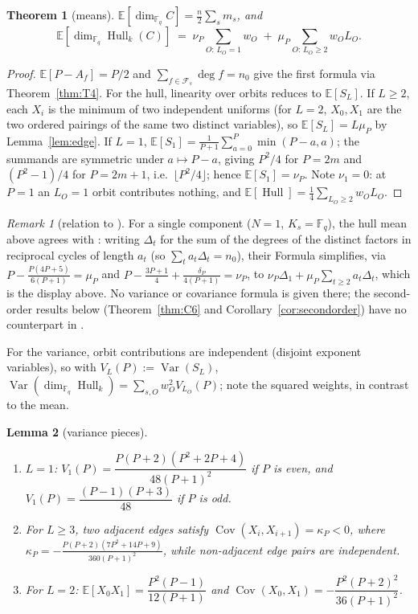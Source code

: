 \documentclass[11pt]{article}
\newtheorem{theorem}{Theorem}[section]
\newtheorem{lemma}[theorem]{Lemma}
\theoremstyle{definition}
\theoremstyle{remark}
\newtheorem*{remark}{Remark}
\newcommand{\Fq}{\mathbb{F}_q}
\newcommand{\Hull}{\operatorname{Hull}}
\newcommand{\E}{\mathbb{E}}
\begin{document}
\begin{theorem}[means]\label{thm:C5}
\(\displaystyle \E[\dim_{\Fq} C] = \frac{n}{2} \sum_s m_s\), and
\[
\E[\dim_{\Fq} \Hull_k(C)] \;=\;
\nu_P \sum_{O:\, L_O = 1} w_O \;+\;
\mu_P \sum_{O:\, L_O \ge 2} w_O L_O .
\]
\end{theorem}

\begin{proof}
\(\E[P - A_f] = P/2\) and \(\sum_{f \in \mathcal{F}_s} \deg f = n_0\)
give the first formula via Theorem~\ref{thm:T4}. For the hull, linearity
over orbits reduces to \(\E[S_L]\). If \(L \ge 2\), each \(X_i\) is the
minimum of two independent uniforms (for \(L=2\), \(X_0, X_1\) are the
two ordered pairings of the same two distinct variables), so
\(\E[S_L] = L\mu_P\) by Lemma~\ref{lem:edge}. If \(L = 1\),
\(\E[S_1] = \frac{1}{P+1}\sum_{a=0}^P \min(P-a,a)\); the summands are
symmetric under \(a \mapsto P-a\), giving \(P^2/4\) for \(P = 2m\) and
\((P^2-1)/4\) for \(P = 2m+1\), i.e.\ \(\lfloor P^2/4 \rfloor\); hence
\(\E[S_1] = \nu_P\). Note \(\nu_1 = 0\): at \(P=1\) an \(L_O=1\) orbit
contributes nothing, and \(\E[\Hull] = \frac14 \sum_{L_O\ge2} w_O L_O\).
\end{proof}

\begin{remark}[relation to \cite{DP2025}]
For a single component (\(N = 1\), \(K_s = \Fq\)), the hull mean above
agrees with \cite[Theorem~3.3]{DP2025}: writing \(\Delta_t\) for the sum
of the degrees of the distinct factors in reciprocal cycles of length
\(a_t\) (so \(\sum_t a_t \Delta_t = n_0\)), their Formula simplifies,
via \(P - \frac{P(4P+5)}{6(P+1)} = \mu_P\) and
\(P - \frac{3P+1}{4} + \frac{\delta_P}{4(P+1)} = \nu_P\), to
\(\nu_P \Delta_1 + \mu_P \sum_{t \ge 2} a_t \Delta_t\), which is the
display above. No variance or covariance formula is given there; the
second-order results below (Theorem~\ref{thm:C6} and
Corollary~\ref{cor:secondorder}) have no counterpart in \cite{DP2025}.
\end{remark}

For the variance, orbit contributions are independent (disjoint exponent
variables), so with \(V_L(P) := \operatorname{Var}(S_L)\),
\(\operatorname{Var}(\dim_{\Fq}\Hull_k) = \sum_{s,O} w_O^2 V_{L_O}(P)\);
note the squared weights, in contrast to the mean.

\begin{lemma}[variance pieces]\label{lem:varpieces}
\begin{enumerate}
\item[(i)] \(L=1\):
\(V_1(P) = \dfrac{P(P+2)(P^2+2P+4)}{48(P+1)^2}\) if \(P\) is even, and
\(V_1(P) = \dfrac{(P-1)(P+3)}{48}\) if \(P\) is odd.
\item[(ii)] For \(L \ge 3\), two adjacent edges satisfy
\(\operatorname{Cov}(X_i, X_{i+1}) = \kappa_P < 0\), where
\(\kappa_P = -\frac{P(P+2)(7P^2+14P+9)}{360(P+1)^2}\), while non-adjacent edge pairs
are independent.
\item[(iii)] For \(L=2\):
\(\E[X_0 X_1] = \dfrac{P^2(P-1)}{12(P+1)}\) and
\(\operatorname{Cov}(X_0,X_1) = -\dfrac{P^2(P+2)^2}{36(P+1)^2}\).
\end{enumerate}
\end{lemma}
\end{document}
